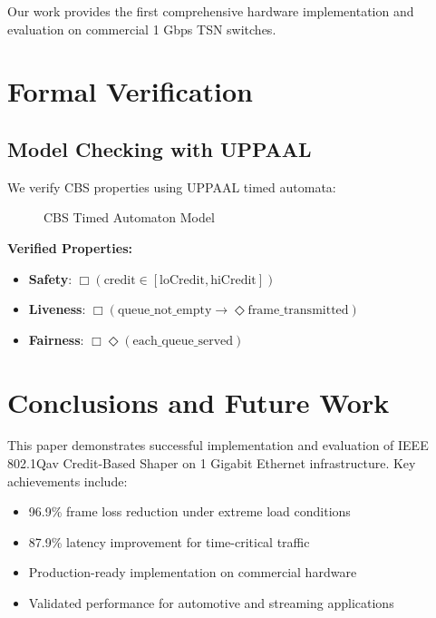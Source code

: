 \documentclass[10pt, journal, compsoc]{IEEEtran}
\begin{document}
Our work provides the first comprehensive hardware implementation and evaluation on commercial 1 Gbps TSN switches.

\section{Formal Verification}

\subsection{Model Checking with UPPAAL}

We verify CBS properties using UPPAAL timed automata:

\begin{figure}[H]
\centering
{}
\caption{CBS Timed Automaton Model}
\end{figure}

\textbf{Verified Properties:}
\begin{itemize}
    \item \textbf{Safety}: $\Box(\text{credit} \in [\text{loCredit}, \text{hiCredit}])$
    \item \textbf{Liveness}: $\Box(\text{queue\_not\_empty} \rightarrow \Diamond \text{frame\_transmitted})$
    \item \textbf{Fairness}: $\Box\Diamond(\text{each\_queue\_served})$
\end{itemize}

\section{Conclusions and Future Work}

This paper demonstrates successful implementation and evaluation of IEEE 802.1Qav Credit-Based Shaper on 1 Gigabit Ethernet infrastructure. Key achievements include:

\begin{itemize}
    \item 96.9\% frame loss reduction under extreme load conditions
    \item 87.9\% latency improvement for time-critical traffic
    \item Production-ready implementation on commercial hardware
    \item Validated performance for automotive and streaming applications
\end{itemize}
\end{document}
